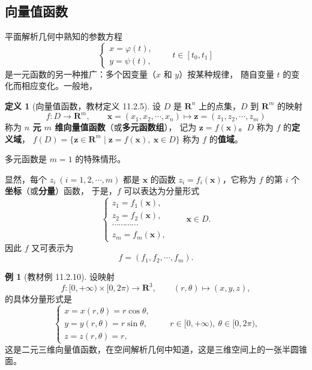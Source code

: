 \documentclass[11pt]{ctexart}
\theoremstyle{plain}
\theoremstyle{definition}
\newtheorem{defn}[thm]{定义}
\newtheorem{ex}[thm]{例}
\theoremstyle{remark}
\begin{document}
\subsection{向量值函数}

平面解析几何中熟知的参数方程
\[
  \begin{cases}
    x=\varphi(t),\\ y=\psi(t),
  \end{cases}\qquad t\in[t_0,t_1]
\]
是一元函数的另一种推广：多个因变量（\(x\) 和 \(y\)）按某种规律，
随自变量 \(t\) 的变化而相应变化。一般地，

\begin{defn}[向量值函数，教材定义 11.2.5]\label{def:vectorfunc}
设 \(D\) 是 \(\mathbf{R}^n\) 上的点集，\(D\) 到 \(\mathbf{R}^m\) 的映射
\[
  f\colon D\to\mathbf{R}^m,\qquad
  \boldsymbol{x}=(x_1,x_2,\cdots,x_n)\mapsto
  \boldsymbol{z}=(z_1,z_2,\cdots,z_m)
\]
称为 \textbf{\(n\) 元 \(m\) 维向量值函数}（或\textbf{多元函数组}），
记为 \(\boldsymbol{z}=f(\boldsymbol{x})\)。\(D\) 称为 \(f\) 的\textbf{定义域}，
\(f(D)=\{\boldsymbol{z}\in\mathbf{R}^m\mid \boldsymbol{z}=f(\boldsymbol{x}),\ \boldsymbol{x}\in D\}\)
称为 \(f\) 的\textbf{值域}。
\end{defn}

多元函数是 \(m=1\) 的特殊情形。

显然，每个 \(z_i\ (i=1,2,\cdots,m)\) 都是 \(\boldsymbol{x}\) 的函数
\(z_i=f_i(\boldsymbol{x})\)，它称为 \(f\) 的第 \(i\) 个\textbf{坐标}（或\textbf{分量}）函数，
于是，\(f\) 可以表达为分量形式
\[
  \begin{cases}
    z_1=f_1(\boldsymbol{x}),\\
    z_2=f_2(\boldsymbol{x}),\\
    \cdots\cdots\cdots\cdots\\
    z_m=f_m(\boldsymbol{x}),
  \end{cases}\qquad \boldsymbol{x}\in D .
\]
因此 \(f\) 又可表示为
\[
  f=(f_1,f_2,\cdots,f_m).
\]

\begin{ex}[教材例 11.2.10]\label{ex:cone}
设映射
\[
  f\colon [0,+\infty)\times[0,2\pi)\to\mathbf{R}^3,\qquad
  (r,\theta)\mapsto(x,y,z),
\]
的具体分量形式是
\[
  \begin{cases}
    x=x(r,\theta)=r\cos\theta,\\
    y=y(r,\theta)=r\sin\theta,\\
    z=z(r,\theta)=r,
  \end{cases}\qquad r\in[0,+\infty),\ \theta\in[0,2\pi),
\]
这是二元三维向量值函数，在空间解析几何中知道，这是三维空间上的一张半圆锥面。
\end{ex}
\end{document}
